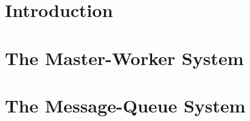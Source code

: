\section{Introduction}\label{sec:intro-init-experiment}


\section{The Master-Worker System}\label{sec:mw}


\section{The Message-Queue System}\label{sec:mq}

